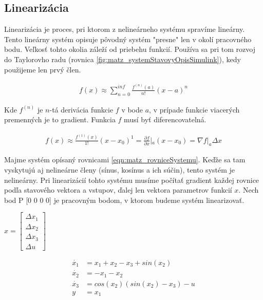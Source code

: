 \documentclass[../main.tex]{subfiles}
\begin{document}
\subsection{Linearizácia}

Linearizácia je proces, pri ktorom z nelineárneho systému spravíme lineárny. Tento lineárny systém opisuje pôvodný systém "presne" len v okolí pracovného bodu. Veľkosť tohto okolia záleží od priebehu funkcií. Používa sa pri tom rozvoj do Taylorovho radu (rovnica \ref{fig:matz_systemStavovyOpisSimulink}), kedy použijeme len prvý člen.

\begin{equation}
	\begin{split}
		f(x) \approx \sum^{inf}_{n=0}{\frac{f^{(n)}(a)}{n!}(x-a)^n}
	\end{split}
	\label{eqn:matz_taylorovRad}
\end{equation}

Kde $f^{(n)}$ je $n$-tá derivácia funkcie $f$ v bode $a$, v prípade funkcie viacerých premenných je to gradient. Funkcia $f$ musí byť diferencovatelná.

\begin{equation}
	\begin{split}
		f(x) \approx \frac{f^{(1)}(x)}{1!}(x-x_0)^1 = \frac{\partial{f}}{\partial{x}}|_{a}(x-x_0) = \nabla{f}|_{a}\Delta{x}
	\end{split}
	\label{eqn:matz_prvyClenTaylorovhoRadu}
\end{equation}

Majme systém opísaný rovnicami \ref{eqn:matz_rovniceSystemu}. Keďže sa tam vyskytujú aj nelineárne členy (sínus, kosínus a ich súčin), tento systém je nelineárny. Pri linearizácií tohto systému musíme počítať gradient každej rovnice podľa stavového vektora a vstupov, ďalej len vektora parametrov funkcií $x$. Nech bod P [0 0 0 0] je pracovným bodom, v ktorom budeme systém linearizovať.
\begin{center}
$x = \begin{bmatrix}
\Delta{x_1} \\
\Delta{x_2} \\
\Delta{x_3} \\
\Delta{u}
\end{bmatrix}$
\end{center}

\begin{equation}
		\begin{aligned}
		\dot{x_1} &= x_1 + x_2 - x_3 + sin(x_2) 			\\
		\dot{x_2} &= - x_1 - x_2 						\\
		\dot{x_3} &= cos(x_2) (sin(x_2) - x_3) - u 	\\
		y &= x_1
		\end{aligned}
		\label{eqn:matz_rovniceSystemu}
\end{equation}
\end{document}

